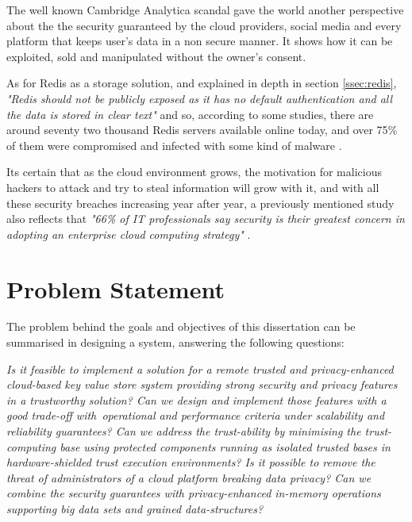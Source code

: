 The well known Cambridge Analytica scandal \cite{cambridge_analytica:1} gave the world another perspective about the the security guaranteed by the cloud providers, social media and every platform that keeps user's data in a non secure manner. It shows how it can be exploited, sold and manipulated without the owner's consent.

As for Redis as a storage solution, and explained in depth in section \ref{ssec:redis}, \textit{"Redis should not be publicly exposed as it has no default authentication and all the data is stored in clear text"} and so, according to some studies, there are around seventy two thousand Redis servers available online today, and over 75{\%} of them were compromised and infected with some kind of malware \cite{redis_leak:1, redis_leak:2, redis_leak:3}.

Its certain that as the cloud environment grows, the motivation for malicious hackers to attack and try to steal information will grow with it, and with all these security breaches increasing year after year, a previously mentioned study also reflects that \textit{"66{\%} of IT professionals say security is their greatest concern in adopting an enterprise cloud computing strategy"} \cite{cloud_statistic:1}.


\section{Problem Statement} %
\label{sec:problem_statement}

The problem behind the goals and objectives of this dissertation can be summarised in designing a system, answering the following questions:

\textit{Is it feasible to implement a solution for a remote trusted and privacy-enhanced cloud-based key value store system providing strong security and privacy features in a trustworthy solution? Can we design and implement those features with a good trade-off with operational and performance criteria under scalability and reliability guarantees? Can we address the trust-ability by minimising the trust-computing base using protected components running as isolated trusted bases in hardware-shielded trust execution environments? Is it possible to remove the threat of administrators of a cloud platform breaking data privacy? Can we combine the security guarantees with privacy-enhanced in-memory operations supporting big data sets and grained data-structures?}

